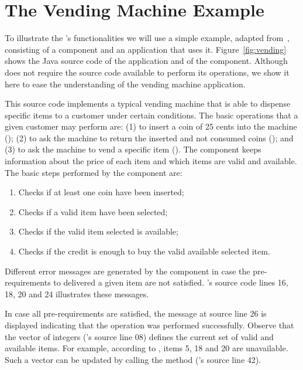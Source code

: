 \section{The Vending Machine Example}\label{sec:example}

To illustrate the \toolname's functionalities we will use a simple
example, adapted from~\cite{Orso01UCMS}, consisting of a component
and an application that uses it. Figure~\ref{fig:vending} shows
the Java source code of the  application and of
the  component. Although \toolname does not require
the source code available to perform its operations, we show it
here to ease the understanding of the vending machine application.

This source code implements a typical vending machine that is able
to dispense specific items to a customer under certain conditions.
The basic operations that a given customer may perform are: (1) to
insert a coin of 25 cents into the machine
(); (2) to ask the machine to
return the inserted and not consumed coins
(); and (3) to ask the machine to
vend a specific item (). The
 component keeps information about the price of each
item and which items are valid and available. The basic steps
performed by the  component are:

\begin{enumerate}
    \item Checks if at least one coin have been inserted;
    \item Checks if a valid item have been selected;
    \item Checks if the valid item selected is available;
    \item Checks if the credit is enough to buy the valid
    available selected item.
\end{enumerate}

Different error messages are generated by the 
component in case the pre-requirements to delivered a given item
are not satisfied. 's source code lines 16, 18, 20
and 24 illustrates these messages.

In case all pre-requirements are satisfied, the message at source
line 26 is displayed indicating that the operation was performed
successfully. Observe that the vector of integers
 ('s source line 08) defines
the current set of valid and available items. For example,
according to , items 5, 18 and 20 are
unavailable. Such a vector can be updated by calling the
 method ('s source
line 42).

